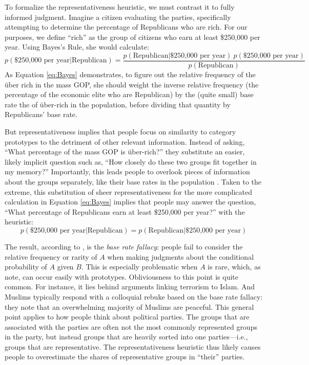 \documentclass[12pt, letterpaper]{article}
\begin{document}
To formalize the representativeness heuristic, we must contrast it to fully informed judgment. Imagine a citizen evaluating the parties, specifically attempting to determine the percentage of Republicans who are rich. For our purposes, we define ``rich'' as the group of citizens who earn at least \$250,000 per year. Using Bayes's Rule, she would calculate:
\begin{equation} \label{eq:Bayes}
p(\text{\$250,000 per year} | \text{Republican}) = \frac{p(\text{Republican} | \text{\$250,000 per year}) \: p(\text{\$250,000 per year})}{p(\text{Republican})}
\end{equation}
As Equation \ref{eq:Bayes} demonstrates, to figure out the relative frequency of the \"{u}ber rich in the mass GOP, she should weight the inverse relative frequency (the percentage of the economic elite who are Republican) by the (quite small) base rate the of \"{u}ber-rich in the population, before dividing that quantity by Republicans' base rate. 

But representativeness implies that people focus on similarity to category prototypes to the detriment of other relevant information. Instead of asking, ``What percentage of the mass GOP is \"{u}ber-rich?'' they substitute an easier, likely implicit question such as, ``How closely do these two groups fit together in my memory?'' Importantly, this leads people to overlook pieces of information about the groups separately, like their base rates in the population \citep{KahnemanFrederick2002}. Taken to the extreme, this substitution of sheer representativeness for the more complicated calculation in Equation \ref{eq:Bayes}  implies that people may answer the question, ``What percentage of Republicans earn at least \$250,000 per year?'' with the heuristic:
\begin{equation} \label{eq:rep}
p(\text{\$250,000 per year} | \text{Republican}) = p(\text{Republican} | \text{\$250,000 per year})
\end{equation}

The result, according to \citet{TverskyKahneman1973}, is the \emph{base rate fallacy}: people fail to consider the relative frequency or rarity of $A$ when making judgments about the conditional probability of $A$ given $B$. This is especially problematic when $A$ is rare, which, as \citet{RoschMervis1975} note, can occur easily with prototypes. Obliviousness to this point is quite common. For instance, it lies behind arguments linking terrorism to Islam. And Muslims typically respond with a colloquial rebuke based on the base rate fallacy: they note that an overwhelming majority of Muslims are peaceful. This general point applies to how people think about political parties. The groups that are associated with the parties are often not the most commonly represented groups in the party, but instead groups that are heavily sorted into one parties---i.e., groups that are representative. The representativeness heuristic thus likely causes people to overestimate the shares of representative groups in ``their'' parties. 
\end{document}
